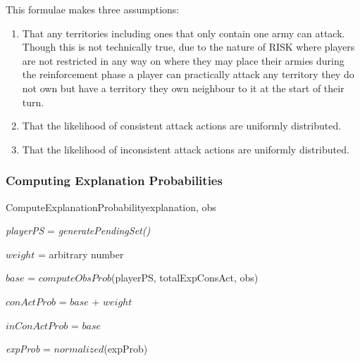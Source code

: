 \documentclass[parskip]{cs4rep}
\begin{document}
This formulae makes three assumptions:

\begin{enumerate}
\item
That any territories including ones that only contain one army can attack. Though this is not technically true, due to the nature of RISK where players are not restricted in any way on where they may place their armies during the reinforcement phase a player can practically attack any territory they do not own but have a territory they own neighbour to it at the start of their turn.
\item
That the likelihood of consistent attack actions are uniformly distributed.
\item
That the likelihood of inconsistent attack actions are uniformly distributed.
\end{enumerate}

\subsubsection{Computing Explanation Probabilities}

\begin{pseudocode}[ruled]{ComputeExplanationProbability}{explanation, obs}
\begin{algorithm}[H]


\textit{playerPS} = \textit{generatePendingSet()} \newline

$weight$ = arbitrary number

$base$ = $computeObsProb$(playerPS, totalExpConsAct, obs)\newline

$conActProb$ = $base$ + $weight$

$inConActProb$ = $base$ \newline


\textit{expProb} = $normalized$(expProb)

\end{algorithm}
\end{pseudocode}
\end{document}
